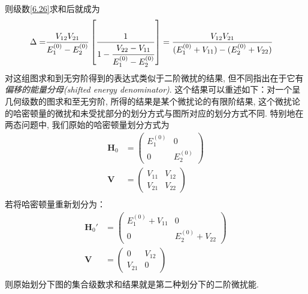 则级数\autoref{6.26}求和后就成为
\begin{align}
\Delta = &  \frac{V_{12}V_{21}}{E^{(0)}_1 - E_2^{(0)}}\left[
        \frac{1}{1-\cfrac{V_{22}-V_{11}}{E_1^{(0)} - E_2^{(0)}}} \right]
   = \frac{V_{12}V_{21}}{(E_1^{(0)} + V_{11}) - (E_2^{(0)} + V_{22})}
\end{align}
对这组图求和到无穷阶得到的表达式类似于二阶微扰的结果, 
但不同指出在于它有\emph{偏移的能量分母(shifted energy denominator)}. 
这个结果可以重述如下：对一个呈几何级数的图求和至无穷阶, 
所得的结果是某个微扰论的有限阶结果, 
这个微扰论的哈密顿量的微扰和未受扰部分的划分方式与图所对应的划分方式不同. 
特别地在两态问题中, 
我们原始的哈密顿量划分方式为
\begin{align*}
\mathbf{H}_0 & = \begin{pmatrix}
E_1^{(0)} & 0 \\
0         & E_2^{(0)}
\end{pmatrix}\\
\mathbf{V} & = \begin{pmatrix}
V_{11} & V_{12} \\
V_{21} & V_{22}
\end{pmatrix}\\
\end{align*} 
若将哈密顿量重新划分为：
\begin{align*}
\mathbf{H}_0' & = \begin{pmatrix}
E_1^{(0)} + V_{11} & 0 \\
0        & E_2^{(0)} + V_{22}
\end{pmatrix}\\
\mathbf{V} & = \begin{pmatrix}
0 & V_{12} \\
V_{21} & 0
\end{pmatrix}\\
\end{align*} 
则原始划分下图的集合级数求和结果就是第二种划分下的二阶微扰能.


